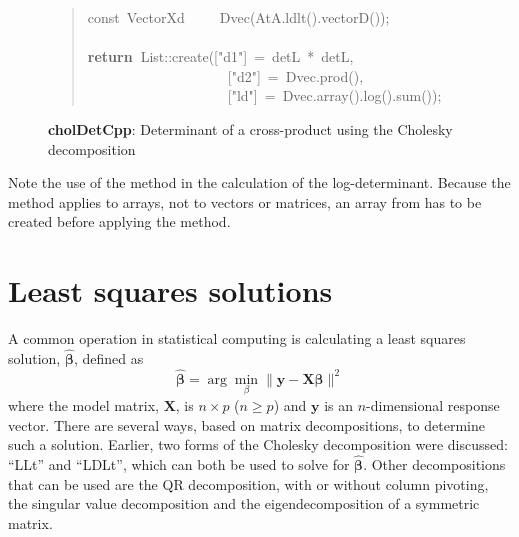 \documentclass[shortnames,article]{jss}
\newcommand{\hlstd}[1]{\textcolor[rgb]{0,0,0}{#1}}
\newcommand{\hlopt}[1]{\textcolor[rgb]{0,0,0}{#1}}
\newcommand{\hlstr}[1]{\textcolor[rgb]{0.90,0.15,0.15}{#1}}
\newcommand{\hlkwa}[1]{\textcolor[rgb]{0.61,0.13,0.93}{\bf{#1}}}
\newcommand{\hlkwb}[1]{\textcolor[rgb]{0.13,0.54,0.13}{#1}}
\newcommand{\hlkwd}[1]{\textcolor[rgb]{0,0,0}{#1}}
\begin{document}
\begin{figure}[htb]
\begin{quote}
    \hlstd{}\hlkwb{const\ }\hlstd{VectorXd}\hlstd{\ \ \ \ \ }\hlstd{}\hlkwd{Dvec}\hlstd{}\hlopt{(}\hlstd{AtA}\hlopt{.}\hlstd{}\hlkwd{ldlt}\hlstd{}\hlopt{().}\hlstd{}\hlkwd{vectorD}\hlstd{}\hlopt{());}\hspace*{\fill}\\
    \hlstd{}\hspace*{\fill}\\
    \hlkwa{return\ }\hlstd{List}\hlopt{::}\hlstd{}\hlkwd{create}\hlstd{}\hlopt{(}\hlstd{\textunderscore }\hlopt{{[}}\hlstd{}\hlstr{"d1"}\hlstd{}\hlopt{{]}\ =\ }\hlstd{detL\ }\hlopt{{*}\ }\hlstd{detL}\hlopt{,}\hspace*{\fill}\\
    \hlstd{}\hlstd{\ \ \ \ \ \ \ \ \ \ \ \ \ \ \ \ \ \ \ \ }\hlstd{\textunderscore }\hlopt{{[}}\hlstd{}\hlstr{"d2"}\hlstd{}\hlopt{{]}\ =\ }\hlstd{Dvec}\hlopt{.}\hlstd{}\hlkwd{prod}\hlstd{}\hlopt{(),}\hspace*{\fill}\\
    \hlstd{}\hlstd{\ \ \ \ \ \ \ \ \ \ \ \ \ \ \ \ \ \ \ \ }\hlstd{\textunderscore }\hlopt{{[}}\hlstd{}\hlstr{"ld"}\hlstd{}\hlopt{{]}\ =\ }\hlstd{Dvec}\hlopt{.}\hlstd{}\hlkwd{array}\hlstd{}\hlopt{().}\hlstd{}\hlkwd{log}\hlstd{}\hlopt{().}\hlstd{}\hlkwd{sum}\hlstd{}\hlopt{());}\hlstd{}\hspace*{\fill}
    \normalfont
    \normalsize
  \end{quote}
  \caption{\textbf{cholDetCpp}: Determinant of a cross-product using the Cholesky decomposition}
  \label{cholDet}
\end{figure}



Note the use of the  method in the calculation of the
log-determinant.  Because the  method applies to arrays,
not to vectors or matrices, an array from  has to be created
before applying the  method.

\pagebreak
\section{Least squares solutions}
\label{sec:leastSquares}

A common operation in statistical computing is calculating a least
squares solution, $\widehat{\bm\beta}$, defined as
\begin{displaymath}
  \widehat{\bm\beta}=\arg\min_{\beta}\|\bm y-\bm X\bm\beta\|^2
\end{displaymath}
where the model matrix, $\bm X$, is $n\times p$ ($n\ge p$) and $\bm y$
is an $n$-dimensional response vector.  There are several ways, based
on matrix decompositions, to determine such a solution.  Earlier, two forms
of the Cholesky decomposition were discussed: ``LLt'' and
``LDLt'', which can both be used to solve for $\widehat{\bm\beta}$.  Other
decompositions that can be used are the QR decomposition, with or
without column pivoting, the singular value decomposition and the
eigendecomposition of a symmetric matrix.
\end{document}
